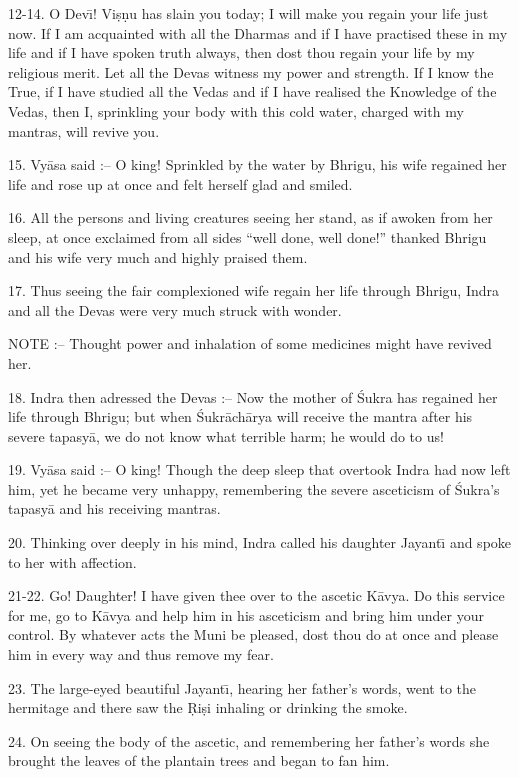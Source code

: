 12-14. O Dev\={\i}! Vi\d{s}\d{n}u has slain you today; I will make you regain your life just now. If I am acquainted with all the Dharmas and if I have practised these in my life and if I have spoken truth always, then dost thou regain your life by my religious merit. Let all the Devas witness my power and strength. If I know the True, if I have studied all the Vedas and if I have realised the Knowledge of the Vedas, then I, sprinkling your body with this cold water, charged with my mantras, will revive you.

15. Vy\=asa said :-- O king! Sprinkled by the water by Bhrigu, his wife regained her life and rose up at once and felt herself glad and smiled.

16. All the persons and living creatures seeing her stand, as if awoken from her sleep, at once exclaimed from all sides ``well done, well done!'' thanked Bhrigu and his wife very much and highly praised them.

17. Thus seeing the fair complexioned wife regain her life through Bhrigu, Indra and all the Devas were very much struck with wonder.

NOTE :-- Thought power and inhalation of some medicines might have revived her.

18. Indra then adressed the Devas :-- Now the mother of \'Sukra has regained her life through Bhrigu; but when \'Sukr\=ach\=arya will receive the mantra after his severe tapasy\=a, we do not know what terrible harm; he would do to us!

19. Vy\=asa said :-- O king! Though the deep sleep that overtook Indra had now left him, yet he became very unhappy, remembering the severe asceticism of \'Sukra's tapasy\=a and his receiving mantras.

20. Thinking over deeply in his mind, Indra called his daughter Jayant\={\i} and spoke to her with affection.

21-22. Go! Daughter! I have given thee over to the ascetic K\=avya. Do this service for me, go to K\=avya and help him in his asceticism and bring him under your control. By whatever acts the Muni be pleased, dost thou do at once and please him in every way and thus remove my fear.

23. The large-eyed beautiful Jayant\={\i}, hearing her father's words, went to the hermitage and there saw the \d{R}i\d{s}i inhaling or drinking the smoke.

24. On seeing the body of the ascetic, and remembering her father's words she brought the leaves of the plantain trees and began to fan him.

